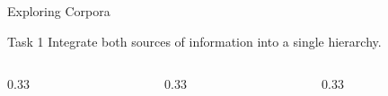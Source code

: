 \begin{frame}{Exploring Corpora}
\begin{block}{Task 1}
Integrate both sources of information into a single hierarchy.
\end{block}

\vspace{1.5em}
\begin{columns}[T,onlytextwidth]
\begin{column}{0.33\textwidth}
\end{column}
\begin{column}{0.33\textwidth}
    \centering

\end{column}
\begin{column}{0.33\textwidth}


\end{column}
\end{columns}

\end{frame}


